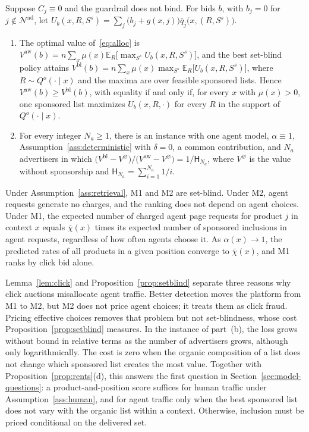 \documentclass[opre,dblanonrev]{informs4}
\providecommand{\E}{\mathbb{E}}
\providecommand{\1}{\mathbf{1}}
\begin{document}
\begin{proposition}\label{prop:setblind}
Suppose $C_j\equiv0$ and the guardrail does not bind. For bids $b$, with $b_j=0$ for $j\notin\mathcal N^{\mathrm{ad}}$, let $U_b(x,R,S^s)=\sum_j\bigl(b_j+g(x,j)\bigr)\bar q_j\bigl(x,(R,S^s)\bigr)$.
\begin{enumerate}
\item[(a)] The optimal value of~\eqref{eq:alloc} is $V^{\mathrm{aw}}(b)=n\sum_x\mu(x)\E_R\bigl[\max_{S^s}U_b(x,R,S^s)\bigr]$, and the best set-blind policy attains $V^{\mathrm{bl}}(b)=n\sum_x\mu(x)\max_{S^s}\E_R\bigl[U_b(x,R,S^s)\bigr]$, where $R\sim Q^o(\cdot\mid x)$ and the maxima are over feasible sponsored lists. Hence $V^{\mathrm{aw}}(b)\ge V^{\mathrm{bl}}(b)$, with equality if and only if, for every $x$ with $\mu(x)>0$, one sponsored list maximizes $U_b(x,R,\cdot)$ for every $R$ in the support of $Q^o(\cdot\mid x)$.
\item[(b)] For every integer $N_a\ge1$, there is an instance with one agent model, $\alpha\equiv1$, Assumption~\ref{ass:deterministic} with $\delta=0$, a common contribution, and $N_a$ advertisers in which $\bigl(V^{\mathrm{bl}}-V^{\varnothing}\bigr)/\bigl(V^{\mathrm{aw}}-V^{\varnothing}\bigr)=1/\mathsf H_{N_a}$, where $V^{\varnothing}$ is the value without sponsorship and $\mathsf H_{N_a}=\sum_{i=1}^{N_a}1/i$.
\end{enumerate}
\end{proposition}

\begin{lemma}\label{lem:click}
Under Assumption~\ref{ass:retrieval}, M1 and M2 are set-blind. Under M2, agent requests generate no charges, and the ranking does not depend on agent choices. Under M1, the expected number of charged agent page requests for product $j$ in context $x$ equals $\bar\chi(x)$ times its expected number of sponsored inclusions in agent requests, regardless of how often agents choose it. As $\alpha(x)\to1$, the predicted rates of all products in a given position converge to $\bar\chi(x)$, and M1 ranks by click bid alone.
\end{lemma}

Lemma~\ref{lem:click} and Proposition~\ref{prop:setblind} separate three reasons why click auctions misallocate agent traffic. Better detection moves the platform from M1 to M2, but M2 does not price agent choices; it treats them as click fraud. Pricing effective choices removes that problem but not set-blindness, whose cost Proposition~\ref{prop:setblind} measures. In the instance of part~(b), the loss grows without bound in relative terms as the number of advertisers grows, although only logarithmically. The cost is zero when the organic composition of a list does not change which sponsored list creates the most value. Together with Proposition~\ref{prop:rents}(d), this answers the first question in Section~\ref{sec:model-questions}: a product-and-position score suffices for human traffic under Assumption~\ref{ass:human}, and for agent traffic only when the best sponsored list does not vary with the organic list within a context. Otherwise, inclusion must be priced conditional on the delivered set.
\end{document}
